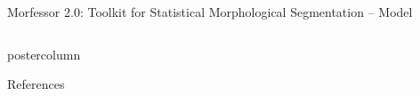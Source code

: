 \documentclass[final]{beamer} %
\begin{document}
\begin{frame}{Morfessor 2.0: Toolkit for Statistical Morphological Segmentation -- Model}
\begin{columns}
\begin{column}{.3\textwidth}
  \begin{beamercolorbox}[center,wd=\textwidth]{postercolumn}
 \begin{block}{References}
\footnotesize

           
            \end{block}
            
	\end{beamercolorbox}


\end{column}

\end{columns}
 \end{frame}



  
\end{document}
